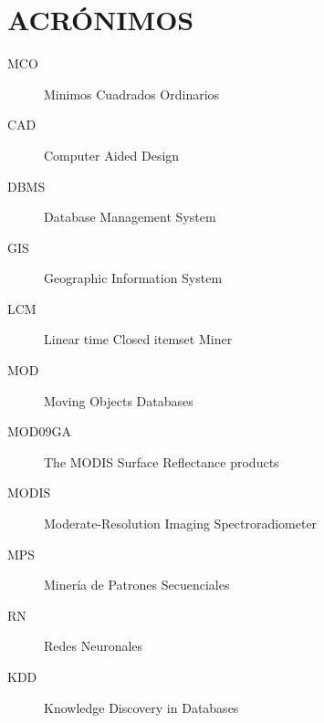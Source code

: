 \chapter*{ACRÓNIMOS}
 
\begin{description}
 \item [MCO] Minimos Cuadrados Ordinarios
 \item [CAD] Computer Aided Design
 \item [DBMS] Database Management System
 \item [GIS] Geographic Information System
 \item [LCM] Linear time Closed itemset Miner
 \item [MOD] Moving Objects Databases
 \item [MOD09GA] The MODIS Surface Reflectance products
 \item [MODIS] Moderate-Resolution Imaging Spectroradiometer
 \item [MPS] Minería de Patrones Secuenciales
 \item [RN] Redes Neuronales
 \item [KDD] Knowledge Discovery in Databases
 
\end{description}

